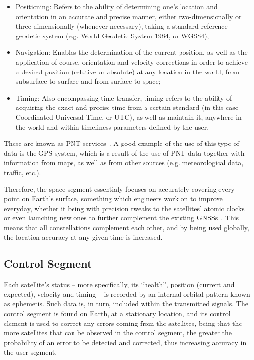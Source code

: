\begin{itemize}
    \item Positioning: Refers to the ability of determining one's location and orientation in an accurate and precise manner, either two-dimensionally or three-dimensionally (whenever necessary), taking a standard reference geodetic system (e.g. World Geodetic System 1984, or WGS84);
    \item Navigation: Enables the determination of the current position, as well as the application of course, orientation and velocity corrections in order to achieve a desired position (relative or absolute) at any location in the world, from subsurface to surface and from surface to space;
    \item Timing: Also encompassing time transfer, timing refers to the ability of acquiring the exact and precise time from a certain standard (in this case Coordinated Universal Time, or UTC), as well as maintain it, anywhere in the world and within timeliness parameters defined by the user.
\end{itemize}
These are known as PNT services~\cite{pnt_2017}.
A good example of the use of this type of data is the GPS system, which is a result of the use of PNT data together with information from maps, as well as from other sources (e.g. meteorological data, traffic, etc.).

Therefore, the space segment essentialy focuses on accurately covering every point on Earth's surface, something which engineers work on to improve everyday, whether it being with precision tweaks to the satellites' atomic clocks or even launching new ones to further complement the existing GNSSs~\cite{euspa_news_2022}. This means that all constellations complement each other, and by being used globally, the location accuracy at any given time is increased.

\subsection{Control Segment}\label{sec:II_gnss_control_seg}

Each satellite's status -- more specifically, its ``health'', position (current and expected), velocity and timing -- is recorded by an internal orbital pattern known as \gls{ephemeris}. Such data is, in turn, included within the transmitted signals. The control segment is found on Earth, at a stationary location, and its control element is used to correct any errors coming from the satellites, being that the more satellites that can be observed in the control segment, the greater the probability of an error to be detected and corrected, thus increasing accuracy in the user segment.

